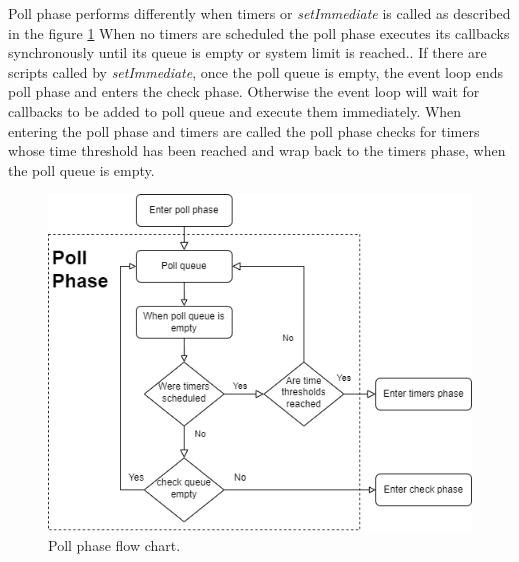 Poll phase performs differently when timers or \textit{setImmediate} is called as described in the figure \ref{figure:nodejs:pollPhase}
When no timers are scheduled the poll phase executes its callbacks synchronously until its queue is empty or system limit is reached..
If there are scripts called by \textit{setImmediate}, once the poll queue is empty, the event loop ends poll phase and enters the check phase.
Otherwise the event loop will wait for callbacks to be added to poll queue and execute them immediately.
When entering the poll phase and timers are called the poll phase checks for timers whose time threshold has been reached and wrap back to the timers phase, when the poll queue is empty.
\begin{figure}[htbp]
    \includegraphics[scale=0.8]{images/poll_phase_flow_chart.png}
    \caption{Poll phase flow chart.}
    \label{figure:nodejs:pollPhase}
\end{figure}